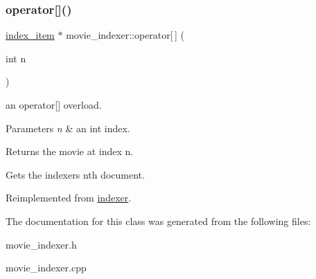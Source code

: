 \subsubsection{\texorpdfstring{operator[]()}{operator[]()}\hspace{0.1cm}{\footnotesize\ttfamily [2/2]}}
{\footnotesize\ttfamily \hyperlink{classindex__item}{index\+\_\+item} $\ast$ movie\+\_\+indexer\+::operator\mbox{[}$\,$\mbox{]} (\begin{DoxyParamCaption}\item[{int}]{n }\end{DoxyParamCaption})\hspace{0.3cm}{\ttfamily [virtual]}}



an operator\mbox{[}\mbox{]} overload. 


\begin{DoxyParams}{Parameters}
{\em n} & an int index. \\
\hline
\end{DoxyParams}
\begin{DoxyReturn}{Returns}
the movie at index n.
\end{DoxyReturn}
Gets the indexer\textquotesingle{}s n\textquotesingle{}th document. 

Reimplemented from \hyperlink{classindexer_ae71041fc84d94155473de60e4407d5cc}{indexer}.



The documentation for this class was generated from the following files\+:\begin{DoxyCompactItemize}
\item 
movie\+\_\+indexer.\+h\item 
movie\+\_\+indexer.\+cpp\end{DoxyCompactItemize}
